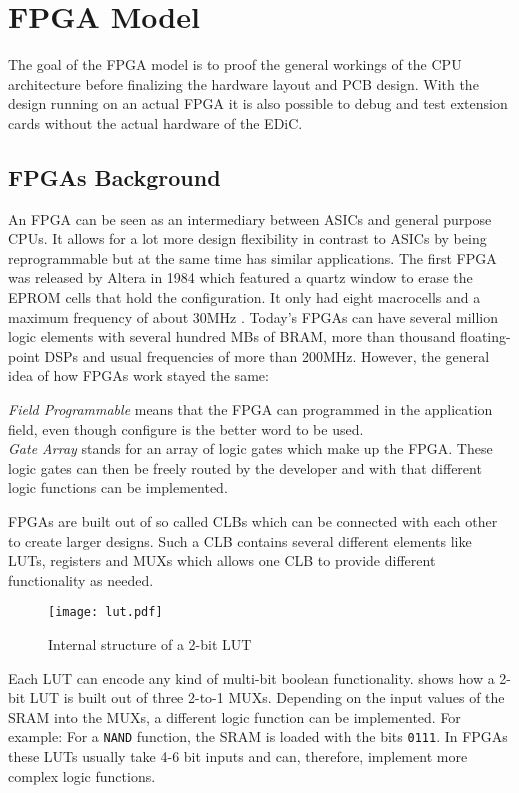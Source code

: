 \chapter{\gls{FPGA} Model}\label{cha:fpga}
The goal of the \gls{FPGA} model is to proof the general workings of the \gls{CPU} architecture before finalizing the hardware layout and \gls{PCB} design.
With the design running on an actual \gls{FPGA} it is also possible to debug and test extension cards without the actual hardware of the \gls{EDiC}.


\section{\glspl{FPGA} Background}
An \gls{FPGA} can be seen as an intermediary between \glspl{ASIC} and general purpose \glspl{CPU}.
It allows for a lot more design flexibility in contrast to \glspl{ASIC} by being reprogrammable but at the same time has similar applications.
The first \gls{FPGA} was released by Altera in 1984 which featured a quartz window to erase the \gls{EPROM} cells that hold the configuration.
It only had eight macrocells and a maximum frequency of about 30MHz \cite{ref:altera_databook}.
Today's \glspl{FPGA} can have several million logic elements with several hundred MBs of \gls{BRAM}, more than thousand floating-point \glspl{DSP} and usual frequencies of more than 200MHz.
However, the general idea of how \glspl{FPGA} work stayed the same:

\emph{Field Programmable} means that the \gls{FPGA} can programmed in the application field, even though configure is the better word to be used.\\
\emph{Gate Array} stands for an array of logic gates which make up the \gls{FPGA}.
These logic gates can then be freely routed by the developer and with that different logic functions can be implemented.

\glspl{FPGA} are built out of so called \glspl{CLB} which can be connected with each other to create larger designs.
Such a \gls{CLB} contains several different elements like \glspl{LUT}, registers and \glspl{MUX} which allows one \gls{CLB} to provide different functionality as needed.
\begin{figure}
  \centering
  \texttt{[image: lut.pdf]}
  \caption{Internal structure of a 2-bit \gls{LUT}}
  \label{fig:lut}
\end{figure}
Each \gls{LUT} can encode any kind of multi-bit boolean functionality.
 shows how a 2-bit \gls{LUT} is built out of three 2-to-1 \glspl{MUX}.
Depending on the input values of the \gls{SRAM} into the \glspl{MUX}, a different logic function can be implemented.
For example: For a \texttt{NAND} function, the \gls{SRAM} is loaded with the bits \texttt{0111}.
In \glspl{FPGA} these \glspl{LUT} usually take 4-6 bit inputs and can, therefore, implement more complex logic functions.

